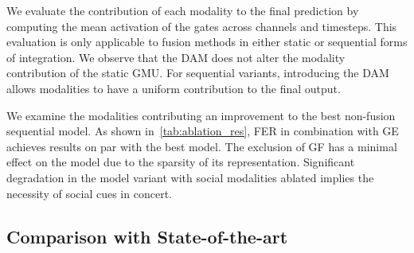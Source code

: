 \documentclass{article}
\begin{document}
We evaluate the contribution of each modality to the final prediction by computing the mean activation of the gates across channels and timesteps. This evaluation is only applicable to fusion methods in either static or sequential forms of integration. We observe that the DAM does not alter the modality contribution of the static GMU. For sequential variants, introducing the DAM allows modalities to have a uniform contribution to the final output.

We examine the modalities contributing an improvement to the best non-fusion sequential model. As shown in~\autoref{tab:ablation_res}, FER in combination with GE achieves results on par with the best model. The exclusion of GF has a minimal effect on the model due to the sparsity of its representation. Significant degradation in the model variant with social modalities ablated implies the necessity of social cues in concert.

\subsection{Comparison with State-of-the-art}

\begin{table}[H]
\centering
\caption{Comparison with state-of-the-art by varying the SCD SP of our best GASP model (DAM + LARGMU; Context Size = 10).}
\label{tab:sota_res}
 \end{table}
 
\end{document}
